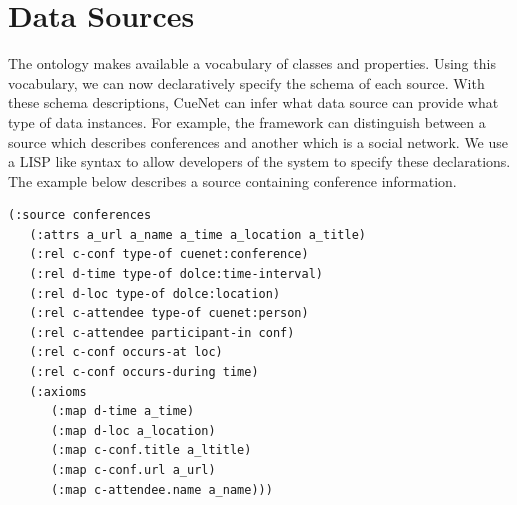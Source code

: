 \section{Data Sources}
\label{sec:data-sources}
The ontology makes available a vocabulary of classes and properties. Using this vocabulary, we can now declaratively specify the schema of each source. With these schema descriptions, CueNet can infer what data source can provide what type of data instances. For example, the framework can distinguish between a source which describes conferences and another which is a social network. We use a LISP like syntax to allow developers of the system to specify these declarations. The example below describes a source containing conference information.

\begin{verbatim}
(:source conferences
   (:attrs a_url a_name a_time a_location a_title)
   (:rel c-conf type-of cuenet:conference)
   (:rel d-time type-of dolce:time-interval)
   (:rel d-loc type-of dolce:location)
   (:rel c-attendee type-of cuenet:person)
   (:rel c-attendee participant-in conf)
   (:rel c-conf occurs-at loc)
   (:rel c-conf occurs-during time)
   (:axioms
      (:map d-time a_time)
      (:map d-loc a_location)
      (:map c-conf.title a_ltitle)
      (:map c-conf.url a_url)
      (:map c-attendee.name a_name)))
\end{verbatim}


